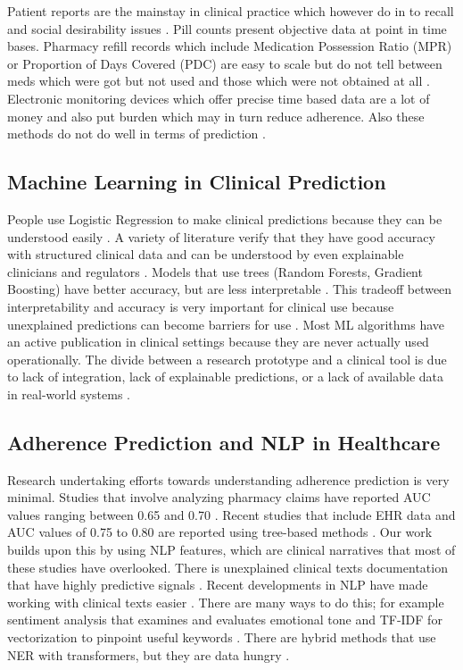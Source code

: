 \documentclass{article}
\begin{document}
Patient reports are the mainstay in clinical practice which however do in to recall and social desirability issues \cite{garfield2011}. Pill counts present objective data at point in time bases. Pharmacy refill records which include Medication Possession Ratio (MPR) or Proportion of Days Covered (PDC) are easy to scale but do not tell between meds which were got but not used and those which were not obtained at all \cite{lo2009,chan2019}. Electronic monitoring devices which offer precise time based data are a lot of money and also put burden which may in turn reduce adherence. Also these methods do not do well in terms of prediction \cite{kardas2013}.

\subsection{Machine Learning in Clinical Prediction}\label{subsec:ml}

People use Logistic Regression to make clinical predictions because they can be understood easily \cite{shipe2019,katzman2024}. A variety of literature verify that they have good accuracy with structured clinical data and can be understood by even explainable clinicians and regulators \cite{shipe2019,longo2024}. Models that use trees (Random Forests, Gradient Boosting) have better accuracy, but are less interpretable \cite{naik2025}. This tradeoff between interpretability and accuracy is very important for clinical use because unexplained predictions can become barriers for use \cite{glass2025,longo2024}. Most ML algorithms have an active publication in clinical settings because they are never actually used operationally. The divide between a research prototype and a clinical tool is due to lack of integration, lack of explainable predictions, or a lack of available data in real-world systems \cite{glass2025}.

\subsection{Adherence Prediction and NLP in Healthcare}\label{subsec:nlp}

Research undertaking efforts towards understanding adherence prediction is very minimal. Studies that involve analyzing pharmacy claims have reported AUC values ranging between 0.65 and 0.70 \cite{bourdes2020}. Recent studies that include EHR data and AUC values of 0.75 to 0.80 are reported using tree-based methods \cite{naik2025,yue2024}. Our work builds upon this by using NLP features, which are clinical narratives that most of these studies have overlooked. There is unexplained clinical texts documentation that have highly predictive signals \cite{vanbulck2024}. Recent developments in NLP have made working with clinical texts easier \cite{villanueva2025}. There are many ways to do this; for example sentiment analysis that examines and evaluates emotional tone and TF-IDF for vectorization to pinpoint useful keywords . There are hybrid methods that use NER with transformers, but they are data hungry \cite{villanueva2025}.
\end{document}
